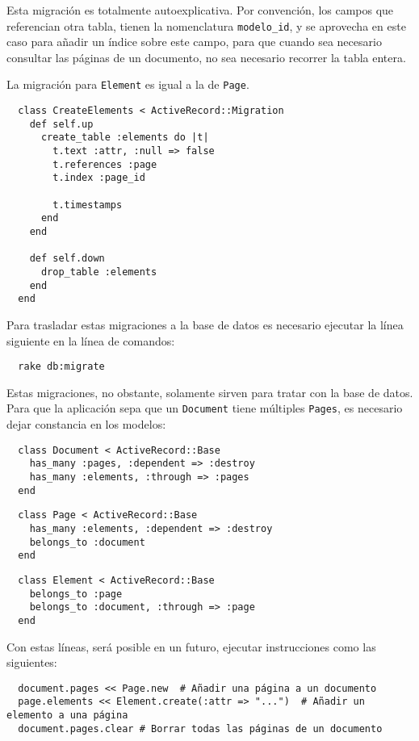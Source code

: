 Esta migración es totalmente autoexplicativa. Por convención, los campos que referencian otra tabla, tienen la nomenclatura \texttt{modelo\_id}, y se aprovecha en este caso para añadir un índice sobre este campo, para que cuando sea necesario consultar las páginas de un documento, no sea necesario recorrer la tabla entera.

La migración para \texttt{Element} es igual a la de \texttt{Page}.

\begin{verbatim}
  class CreateElements < ActiveRecord::Migration
    def self.up
      create_table :elements do |t|
        t.text :attr, :null => false 
        t.references :page
        t.index :page_id

        t.timestamps
      end
    end

    def self.down
      drop_table :elements
    end
  end
\end{verbatim}

Para trasladar estas migraciones a la base de datos es necesario ejecutar la línea siguiente en la línea de comandos:

\begin{verbatim}
  rake db:migrate
\end{verbatim}

Estas migraciones, no obstante, solamente sirven para tratar con la base de datos. Para que la aplicación sepa que un \texttt{Document} tiene múltiples \texttt{Pages}, es necesario dejar constancia en los modelos:

\begin{verbatim}
  class Document < ActiveRecord::Base
    has_many :pages, :dependent => :destroy
    has_many :elements, :through => :pages
  end
\end{verbatim}

\begin{verbatim}
  class Page < ActiveRecord::Base
    has_many :elements, :dependent => :destroy
    belongs_to :document
  end
\end{verbatim}

\begin{verbatim}
  class Element < ActiveRecord::Base
    belongs_to :page
    belongs_to :document, :through => :page
  end
\end{verbatim}


Con estas líneas, será posible en un futuro, ejecutar instrucciones como las siguientes:

\begin{verbatim}
  document.pages << Page.new  # Añadir una página a un documento
  page.elements << Element.create(:attr => "...")  # Añadir un elemento a una página
  document.pages.clear # Borrar todas las páginas de un documento
\end{verbatim}

